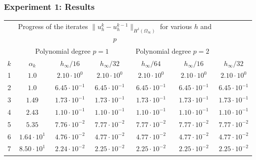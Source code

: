 \documentclass[aspectratio=169,xcolor=dvipsnames,11pt]{beamer}
\begin{document}
\begin{frame}\frametitle{Experiment 1: Results}

\begin{table}
\centering
\tiny
\renewcommand{\arraystretch}{1.3}
\begin{tabular}{ |c|c|c|c|c|c|c| }
 \hhline{|>{\arrayrulecolor{white}}-->{\arrayrulecolor{black}}|-----|}
 \multicolumn{2}{c|}{} & \multicolumn{5}{c|}{\cellcolor{lightgray!15} \small\raisebox{5pt}{\vphantom{f}} Progress of the iterates $\|u_h^{k} - u_h^{k-1}\|_{H^1(\Omega_\infty)}$ for various $h$ and $p$}\\[3pt]
 \hhline{|>{\arrayrulecolor{white}}-->{\arrayrulecolor{black}}|-----|}
 \multicolumn{2}{c|}{}& \multicolumn{3}{c|}{\cellcolor{lightgray!05} Polynomial degree $p = 1$} & \multicolumn{2}{c|}{\cellcolor{lightgray!10} Polynomial degree $p = 2$}\\
 \hline
 \rowcolor{lightgray!15}
 $k$ & $\alpha_{k}$ & $h_\infty/16$ & $h_\infty/32$ & $h_\infty/64$ & $h_\infty/16$ & $h_\infty/32$ \\
 \hline
\cellcolor{lightgray!05}   1 & \cellcolor{lightgray!01}   $1.0$              & $2.10\cdot 10^{0}$   & $2.10\cdot 10^{0}$   & $2.10\cdot 10^{0}$   & $2.10\cdot 10^{0}$   & $2.10\cdot 10^{0}$   \\
\cellcolor{lightgray!05}   2 & \cellcolor{lightgray!01}   $1.0$              & $6.45\cdot 10^{-1}$  & $6.45\cdot 10^{-1}$  & $6.45\cdot 10^{-1}$  & $6.45\cdot 10^{-1}$  & $6.45\cdot 10^{-1}$  \\
\cellcolor{lightgray!05}   3 & \cellcolor{lightgray!01}   $1.49$             & $1.73\cdot 10^{-1}$  & $1.73\cdot 10^{-1}$  & $1.73\cdot 10^{-1}$  & $1.73\cdot 10^{-1}$  & $1.73\cdot 10^{-1}$  \\
\cellcolor{lightgray!05}   4 & \cellcolor{lightgray!01}   $2.43$             & $1.10\cdot 10^{-1}$  & $1.10\cdot 10^{-1}$  & $1.10\cdot 10^{-1}$  & $1.10\cdot 10^{-1}$  & $1.10\cdot 10^{-1}$  \\
\cellcolor{lightgray!05}   5 & \cellcolor{lightgray!01}   $5.35$             & $7.76\cdot 10^{-2}$  & $7.77\cdot 10^{-2}$  & $7.77\cdot 10^{-2}$  & $7.77\cdot 10^{-2}$  & $7.77\cdot 10^{-2}$  \\
\cellcolor{lightgray!05}   6 & \cellcolor{lightgray!01}   $1.64\cdot 10^{1}$ & $4.76\cdot 10^{-2}$  & $4.77\cdot 10^{-2}$  & $4.77\cdot 10^{-2}$  & $4.77\cdot 10^{-2}$  & $4.77\cdot 10^{-2}$  \\
\cellcolor{lightgray!05}   7 & \cellcolor{lightgray!01}   $8.50\cdot 10^{1}$ & $2.24\cdot 10^{-2}$  & $2.25\cdot 10^{-2}$  & $2.25\cdot 10^{-2}$  & $2.25\cdot 10^{-2}$  & $2.25\cdot 10^{-2}$  \\

\end{tabular}
\end{table}
\end{frame}
\end{document}
